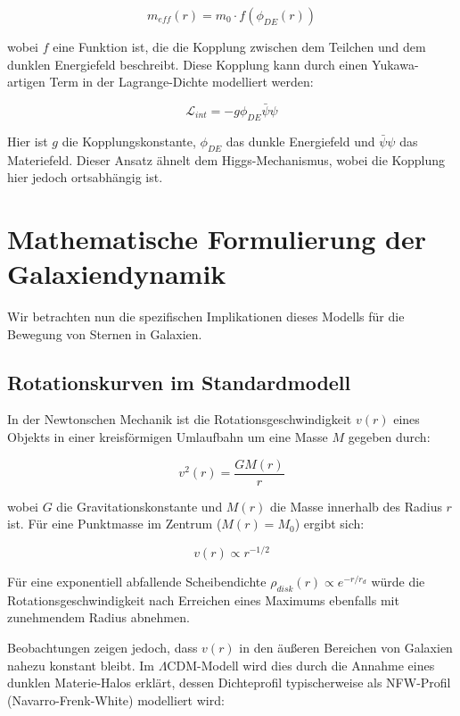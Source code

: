 \documentclass[a4paper,12pt]{article}
\begin{document}
	\begin{equation}
		m_{eff}(r) = m_0 \cdot f(\phi_{DE}(r))
	\end{equation}
	
	wobei $f$ eine Funktion ist, die die Kopplung zwischen dem Teilchen und dem dunklen Energiefeld beschreibt. Diese Kopplung kann durch einen Yukawa-artigen Term in der Lagrange-Dichte modelliert werden:
	
	\begin{equation}
		\mathcal{L}_{int} = -g \phi_{DE} \bar{\psi}\psi
	\end{equation}
	
	Hier ist $g$ die Kopplungskonstante, $\phi_{DE}$ das dunkle Energiefeld und $\bar{\psi}\psi$ das Materiefeld. Dieser Ansatz ähnelt dem Higgs-Mechanismus, wobei die Kopplung hier jedoch ortsabhängig ist.\\
	\section{Mathematische Formulierung der Galaxiendynamik}
	
	Wir betrachten nun die spezifischen Implikationen dieses Modells für die Bewegung von Sternen in Galaxien.
	
	\subsection{Rotationskurven im Standardmodell}
	
	In der Newtonschen Mechanik ist die Rotationsgeschwindigkeit $v(r)$ eines Objekts in einer kreisförmigen Umlaufbahn um eine Masse $M$ gegeben durch:
	
	\begin{equation}
		v^2(r) = \frac{GM(r)}{r}
	\end{equation}
	
	wobei $G$ die Gravitationskonstante und $M(r)$ die Masse innerhalb des Radius $r$ ist. Für eine Punktmasse im Zentrum ($M(r) = M_0$) ergibt sich:
	
	\begin{equation}
		v(r) \propto r^{-1/2}
	\end{equation}
	
	Für eine exponentiell abfallende Scheibendichte $\rho_{disk}(r) \propto e^{-r/r_d}$ würde die Rotationsgeschwindigkeit nach Erreichen eines Maximums ebenfalls mit zunehmendem Radius abnehmen.
	
	Beobachtungen zeigen jedoch, dass $v(r)$ in den äußeren Bereichen von Galaxien nahezu konstant bleibt. Im $\Lambda$CDM-Modell wird dies durch die Annahme eines dunklen Materie-Halos erklärt, dessen Dichteprofil typischerweise als NFW-Profil (Navarro-Frenk-White) modelliert wird:
	
\end{document}
